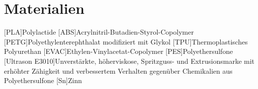 \section*{Materialien}

\begin{acronym}[EuGH]

[PLA]{Polylactide}
[ABS]{Acrylnitril-Butadien-Styrol-Copolymer}
[PETG]{Polyethylenterephthalat modifiziert mit Glykol}
[TPU]{Thermoplastisches Polyurethan}
[EVAC]{Ethylen-Vinylacetat-Copolymer}
[PES]{Polyethersulfone}
[Ultrason E3010]{Unverstärkte, höherviskose, Spritzguss- und Extrusionsmarke mit erhöhter Zähigkeit und verbessertem Verhalten
gegenüber Chemikalien aus Polyethersulfone }
[Sn]{Zinn}


\end{acronym}



